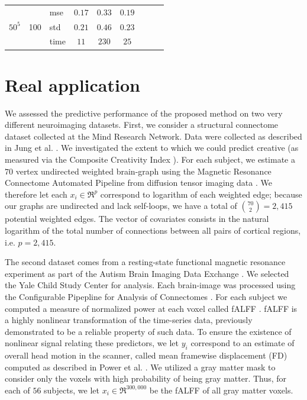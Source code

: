 \documentclass{article} %
\begin{document}
\begin{table}[t]
\begin{center}
\begin{small}
\begin{sc}
\begin{tabular}{lllcccccc}
\\
\multirow{3}{*}{$50^5$}&\multirow{3}{*}{100}&mse &$0.17$&$0.33$&$0.19$\\
&&std & $0.21$ &$0.46$ &$0.23$\\
&&time &$11$ &$230$&$25$\\



\hline
\end{tabular}
\end{sc}
\end{small}
\end{center}
\vskip -0.1in
\end{table}








\section{Real application}

We assessed the predictive performance of the proposed method on two very different neuroimaging datasets. First, we consider a structural connectome dataset collected at the Mind Research Network.  Data were collected as described in Jung et al. \cite{Jung2010}.
We investigated the extent to which we could predict creative (as measured via the Composite Creativity Index \cite{Arden2010}).   For each subject, we estimate a $70$ vertex undirected weighted brain-graph using the Magnetic Resonance Connectome Automated Pipeline \cite{MRCAP11} from diffusion tensor imaging data \cite{Mori2006}. We therefore let each $x_i \in \Re^p$ correspond to logarithm of each weighted edge; because our graphs are undirected and lack self-loops, we have a total of $\binom{70}{2}=2,415$ potential weighted edges.
The vector of covariates consists in the natural logarithm of the total number of connections between all pairs of cortical regions, i.e. $p=2,415$. 

The second dataset comes from a resting-state functional magnetic resonance experiment as part of the Autism Brain Imaging Data Exchange \cite{Autism}.  We selected the Yale Child Study Center for analysis.  Each brain-image was processed using the Configurable Pipepline for Analysis of Connectomes \cite{cpac}. For each subject we computed a measure of normalized power at each voxel called fALFF \cite{Zou2008}.  fALFF is a highly nonlinear transformation of the time-series data, previously demonstrated to be a reliable property of such data.  To ensure the existence of nonlinear signal relating these predictors, we let $y_i$ correspond to an estimate of overall head motion in the scanner, called mean framewise displacement (FD) computed as described in Power et al. \cite{power}.  We utilized a gray matter mask to consider only the voxels with high probability of being gray matter. Thus, for each of $56$ subjects, we let $x_i \in \Re^{300,000}$ be the fALFF of all gray matter voxels.
\end{document}
